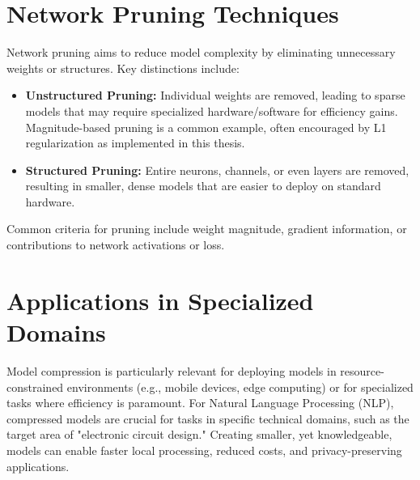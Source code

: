 \documentclass[12pt, a4paper]{report}
\begin{document}
\section{Network Pruning Techniques}
\label{sec:pruning_techniques_review}
Network pruning aims to reduce model complexity by eliminating unnecessary weights or structures. Key distinctions include:
\begin{itemize}
    \item \textbf{Unstructured Pruning:} Individual weights are removed, leading to sparse models that may require specialized hardware/software for efficiency gains. Magnitude-based pruning is a common example, often encouraged by L1 regularization as implemented in this thesis.
    \item \textbf{Structured Pruning:} Entire neurons, channels, or even layers are removed, resulting in smaller, dense models that are easier to deploy on standard hardware.
\end{itemize}
Common criteria for pruning include weight magnitude, gradient information, or contributions to network activations or loss.

\section{Applications in Specialized Domains}
\label{sec:applications_specialized_domains}
Model compression is particularly relevant for deploying models in resource-constrained environments (e.g., mobile devices, edge computing) or for specialized tasks where efficiency is paramount. For Natural Language Processing (NLP), compressed models are crucial for tasks in specific technical domains, such as the target area of "electronic circuit design." Creating smaller, yet knowledgeable, models can enable faster local processing, reduced costs, and privacy-preserving applications.
\end{document}
